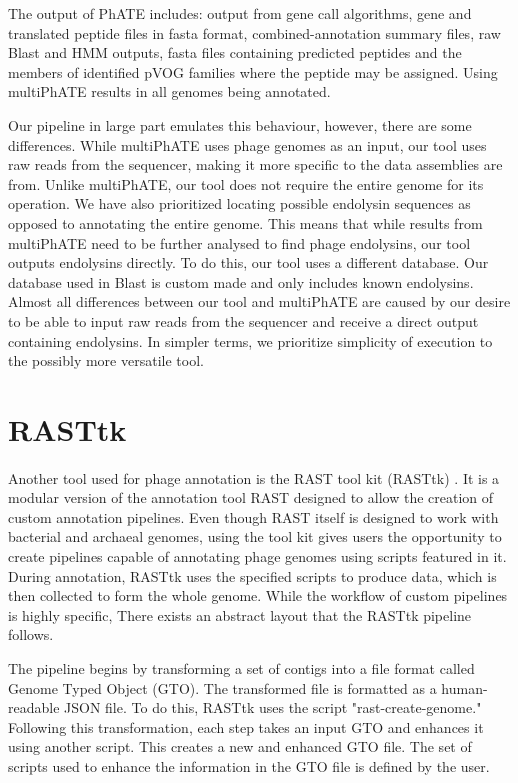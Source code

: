 The output of PhATE includes: output from gene call algorithms, gene and translated peptide files in fasta format, combined-annotation summary files, raw Blast and HMM outputs, fasta files containing predicted peptides and the members of identified pVOG families where the peptide may be assigned. Using multiPhATE results in all genomes being annotated.

Our pipeline in large part emulates this behaviour, however, there are some differences. While multiPhATE uses phage genomes as an input, our tool uses raw reads from the sequencer, making it more specific to the data assemblies are from. Unlike multiPhATE, our tool does not require the entire genome for its operation. We have also prioritized locating possible endolysin sequences as opposed to annotating the entire genome. This means that while results from multiPhATE need to be further analysed to find phage endolysins, our tool outputs endolysins directly. To do this, our tool uses a different database. Our database used in Blast is custom made and only includes known endolysins. Almost all differences between our tool and multiPhATE are caused by our desire to be able to input raw reads from the sequencer and receive a direct output containing endolysins. In simpler terms, we prioritize simplicity of execution to the possibly more versatile tool.

\section{RASTtk}
\paragraph*{}
Another tool used for phage annotation is the RAST tool kit (RASTtk) \cite{brettin2015rasttk}. It is a modular version of the annotation tool RAST designed to allow the creation of custom annotation pipelines. Even though RAST itself is designed to work with bacterial and archaeal genomes, using the tool kit gives users the opportunity to create pipelines capable of annotating phage genomes using scripts featured in it. During annotation, RASTtk uses the specified scripts to produce data, which is then collected to form the whole genome. While the workflow of custom pipelines is highly specific, There exists an abstract layout that the RASTtk pipeline follows.

The pipeline begins by transforming a set of contigs into a file format called Genome Typed Object (GTO). The transformed file is formatted as a human-readable JSON file. To do this, RASTtk uses the script "rast-create-genome." Following this transformation, each step takes an input GTO and enhances it using another script. This creates a new and enhanced GTO file. The set of scripts used to enhance the information in the GTO file is defined by the user.

